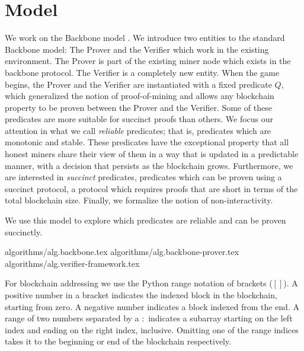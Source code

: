 \section{Model}

We work on the Backbone model \cite{backbone}. We introduce two entities to
the standard Backbone model: The Prover and the Verifier which work in the
existing environment. The Prover is part of the existing miner node which
exists in the backbone protocol. The Verifier is a completely new entity. When
the game begins, the Prover and the Verifier are instantiated with a fixed
predicate $Q$, which generalized the notion of proof-of-mining and allows any
blockchain property to be proven between the Prover and the Verifier. Some of
these predicates are more suitable for succinct proofs than others. We focus
our attention in what we call \textit{ reliable} predicates; that is,
predicates which are monotonic and stable.  These predicates have the
exceptional property that all honest miners share their view of them in a way
that is updated in a predictable manner, with a decision that persists as the
blockchain grows.  Furthermore, we are interested in \textit{succinct}
predicates, predicates which can be proven using a succinct protocol, a
protocol which requires proofs that are short in terms of the total blockchain
size. Finally, we formalize the notion of non-interactivity.

We use this model to explore which predicates are reliable and can be proven
succinctly.

{algorithms/alg.backbone.tex}
{algorithms/alg.backbone-prover.tex}
{algorithms/alg.verifier-framework.tex}

For blockchain addressing we use the Python range notation of brackets ($[]$).
A positive number in a bracket indicates the indexed block in the blockchain,
starting from zero. A negative number indicates a block indexed from the end. A
range of two numbers separated by a $:$ indicates a subarray starting on the
left index and ending on the right index, inclusive. Omitting one of the range
indices takes it to the beginning or end of the blockchain respectively.

